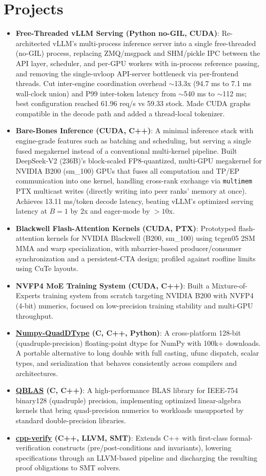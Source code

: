 \documentclass[a4paper,11pt]{article}
\newcommand{\resumeItem}[2]{\item\small{\textbf{#1}: #2}\vspace{-1pt}}
\newcommand{\resumeItemListStart}{\begin{itemize}[leftmargin=1.3em, label=$\bullet$, itemsep=1pt, topsep=2pt, parsep=0pt]}
\newcommand{\resumeItemListEnd}{\end{itemize}\vspace{-3pt}}
\begin{document}
\section{Projects}
\resumeItemListStart
  \resumeItem{Free-Threaded vLLM Serving (Python no-GIL, CUDA)}{Re-architected vLLM's multi-process inference server into a single free-threaded (no-GIL) process, replacing ZMQ/msgpack and SHM/pickle IPC between the API layer, scheduler, and per-GPU workers with in-process reference passing, and removing the single-uvloop API-server bottleneck via per-frontend threads. Cut inter-engine coordination overhead $\sim$13.3x (94.7 ms to 7.1 ms wall-clock union) and P99 inter-token latency from $\sim$540 ms to $\sim$112 ms; best configuration reached 61.96 req/s vs 59.33 stock. Made CUDA graphs compatible in the decode path and added a thread-local tokenizer.}
  \resumeItem{Bare-Bones Inference (CUDA, C++)}{A minimal inference stack with engine-grade features such as batching and scheduling, but serving a single fused megakernel instead of a conventional multi-kernel pipeline. Built DeepSeek-V2 (236B)'s block-scaled FP8-quantized, multi-GPU megakernel for NVIDIA B200 (sm\_100) GPUs that fuses all computation and TP/EP communication into one kernel, handling cross-rank exchange via \texttt{multimem} PTX multicast writes (directly writing into peer ranks' memory at once). Achieves 13.11 ms/token decode latency, beating vLLM's optimized serving latency at $B{=}1$ by 2x and eager-mode by ${>}10$x.}
  \resumeItem{Blackwell Flash-Attention Kernels (CUDA, PTX)}{Prototyped flash-attention kernels for NVIDIA Blackwell (B200, sm\_100) using tcgen05 2SM MMA and warp specialization, with mbarrier-based producer/consumer synchronization and a persistent-CTA design; profiled against roofline limits using CuTe layouts.}
  \resumeItem{NVFP4 MoE Training System (CUDA, C++)}{Built a Mixture-of-Experts training system from scratch targeting NVIDIA B200 with NVFP4 (4-bit) numerics, focused on low-precision training stability and multi-GPU throughput.}
  \resumeItem{\href{https://github.com/numpy/numpy-quaddtype}{Numpy-QuadDType} (C, C++, Python)}{A cross-platform 128-bit (quadruple-precision) floating-point dtype for NumPy with 100k+ downloads. A portable alternative to long double with full casting, ufunc dispatch, scalar types, and serialization that behaves consistently across compilers and architectures.}
  \resumeItem{\href{https://github.com/SwayamInSync/QBLAS}{QBLAS} (C, C++)}{A high-performance BLAS library for IEEE-754 binary128 (quadruple) precision, implementing optimized linear-algebra kernels that bring quad-precision numerics to workloads unsupported by standard double-precision libraries.}
  \resumeItem{\href{https://github.com/SwayamInSync/cpp-verify}{cpp-verify} (C++, LLVM, SMT)}{Extends C++ with first-class formal-verification constructs (pre/post-conditions and invariants), lowering specifications through an LLVM-based pipeline and discharging the resulting proof obligations to SMT solvers.}
\resumeItemListEnd
\end{document}
